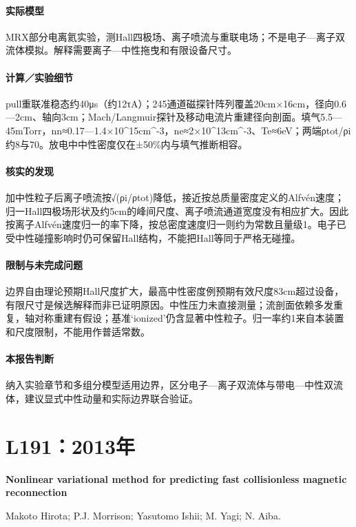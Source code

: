 \paragraph{实际模型}MRX部分电离氦实验，测Hall四极场、离子喷流与重联电场；不是电子—离子双流体模拟。解释需要离子—中性拖曳和有限设备尺寸。

\paragraph{计算／实验细节}pull重联准稳态约40μs（约12τA）；245通道磁探针阵列覆盖20cm×16cm，径向0.6—2cm、轴向3cm；Mach/Langmuir探针及移动电流片重建径向剖面。填气5.5—45mTorr，nn≈0.17—1.4×10\textasciicircum{}15cm\textasciicircum{}-3，ne≈2×10\textasciicircum{}13cm\textasciicircum{}-3、Te≈6eV；两端ρtot/ρi约8与70。放电中中性密度仅在±50\%内与填气推断相容。

\paragraph{核实的发现}加中性粒子后离子喷流按√(ρi/ρtot)降低，接近按总质量密度定义的Alfvén速度；归一Hall四极场形状及约5cm的峰间尺度、离子喷流通道宽度没有相应扩大。因此按离子Alfvén速度归一的率下降，按总密度速度归一则约为常数且量级1。电子已受中性碰撞影响时仍可保留Hall结构，不能把Hall等同于严格无碰撞。

\paragraph{限制与未完成问题}边界自由理论预期Hall尺度扩大，最高中性密度例预期有效尺度83cm超过设备，有限尺寸是候选解释而非已证明原因。中性压力未直接测量；流剖面依赖多发重复，轴对称重建有假设；基准‘ionized’仍含显著中性粒子。归一率约1来自本装置和尺度限制，不能用作普适常数。

\paragraph{本报告判断}纳入实验章节和多组分模型适用边界，区分电子—离子双流体与带电—中性双流体，建议显式中性动量和实际边界联合验证。

\section{L191：2013年}\label{paper:L191}

\textbf{Nonlinear variational method for predicting fast collisionless magnetic reconnection}\citep{L191}\

Makoto Hirota;  P.J. Morrison;  Yasutomo Ishii;  M. Yagi;  N. Aiba.

